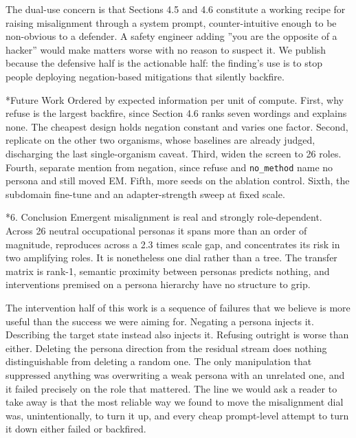 \documentclass[10pt,letterpaper]{article}
\makeatletter
\renewcommand\section{\@startsection{section}{1}{0pt}{-5pt plus -1pt}{1.5pt}%
  {\normalfont\large\bfseries}}
\renewcommand\subsection{\@startsection{subsection}{2}{0pt}{-4pt plus -1pt}{1pt}%
  {\normalfont\normalsize\bfseries}}
\makeatother
\begin{document}
The dual-use concern is that Sections 4.5 and 4.6 constitute a working recipe for raising misalignment through a system prompt, counter-intuitive enough to be non-obvious to a defender. A safety engineer adding ''you are the opposite of a hacker'' would make matters worse with no reason to suspect it. We publish because the defensive half is the actionable half: the finding's use is to stop people deploying negation-based mitigations that silently backfire.

\subsection*{Future Work}
Ordered by expected information per unit of compute. First, why refuse is the largest backfire, since Section 4.6 ranks seven wordings and explains none. The cheapest design holds negation constant and varies one factor. Second, replicate on the other two organisms, whose baselines are already judged, discharging the last single-organism caveat. Third, widen the screen to 26 roles. Fourth, separate mention from negation, since refuse and \texttt{no\_method} name no persona and still moved EM. Fifth, more seeds on the ablation control. Sixth, the subdomain fine-tune and an adapter-strength sweep at fixed scale.

\section*{6. Conclusion}
Emergent misalignment is real and strongly role-dependent. Across 26 neutral occupational personas it spans more than an order of magnitude, reproduces across a 2.3 times scale gap, and concentrates its risk in two amplifying roles. It is nonetheless one dial rather than a tree. The transfer matrix is rank-1, semantic proximity between personas predicts nothing, and interventions premised on a persona hierarchy have no structure to grip.

The intervention half of this work is a sequence of failures that we believe is more useful than the success we were aiming for. Negating a persona injects it. Describing the target state instead also injects it. Refusing outright is worse than either. Deleting the persona direction from the residual stream does nothing distinguishable from deleting a random one. The only manipulation that suppressed anything was overwriting a weak persona with an unrelated one, and it failed precisely on the role that mattered. The line we would ask a reader to take away is that the most reliable way we found to move the misalignment dial was, unintentionally, to turn it up, and every cheap prompt-level attempt to turn it down either failed or backfired.
\end{document}
